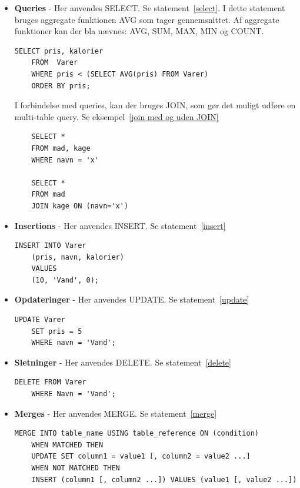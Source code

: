 \begin{itemize}
	\item \textbf{Queries} - Her anvendes SELECT. Se statement~\ref{select}. I dette statement bruges aggregate funktionen AVG som tager gennemsnittet. Af aggregate funktioner kan der bla nævnes: AVG, SUM, MAX, MIN og COUNT.
	\begin{lstlisting}[caption=Query med sub-query,label=select]
	SELECT pris, kalorier
	FROM  Varer
	WHERE pris < (SELECT AVG(pris) FROM Varer)
	ORDER BY pris;
	\end{lstlisting}
	
	I forbindelse med queries, kan der bruges JOIN, som gør det muligt udføre en multi-table query. Se eksempel~\ref{join med og uden JOIN}
	
	\begin{lstlisting}
	SELECT * 
	FROM mad, kage 
	WHERE navn = 'x'
	
	SELECT * 
	FROM mad 
	JOIN kage ON (navn='x') 
	\end{lstlisting}
		
	\item \textbf{Insertions} - Her anvendes INSERT. Se statement~\ref{insert}
	
	\begin{lstlisting}[caption=Brug af INSERT,label=insert]
	INSERT INTO Varer
	(pris, navn, kalorier)
	VALUES
	(10, 'Vand', 0);
	\end{lstlisting}
	
	\item \textbf{Opdateringer} - Her anvendes UPDATE. Se statement~\ref{update}
	
	\begin{lstlisting}[caption=Brug af UPDATE,label=update]
	UPDATE Varer
	SET pris = 5
	WHERE navn = 'Vand';
	\end{lstlisting}
	
	\item \textbf{Sletninger} - Her anvendes DELETE. Se statement~\ref{delete}
	
	\begin{lstlisting}[caption=Brug af DELETE,label=delete]
	DELETE FROM Varer
	WHERE Navn = 'Vand';
	\end{lstlisting}
	
	\item \textbf{Merges} - Her anvendes MERGE. Se statement~\ref{merge}
	
	\begin{lstlisting}[caption=Brug af MERGE,label=merge]
	MERGE INTO table_name USING table_reference ON (condition)
	WHEN MATCHED THEN
	UPDATE SET column1 = value1 [, column2 = value2 ...]
	WHEN NOT MATCHED THEN
	INSERT (column1 [, column2 ...]) VALUES (value1 [, value2 ...])
	\end{lstlisting}
\end{itemize}
